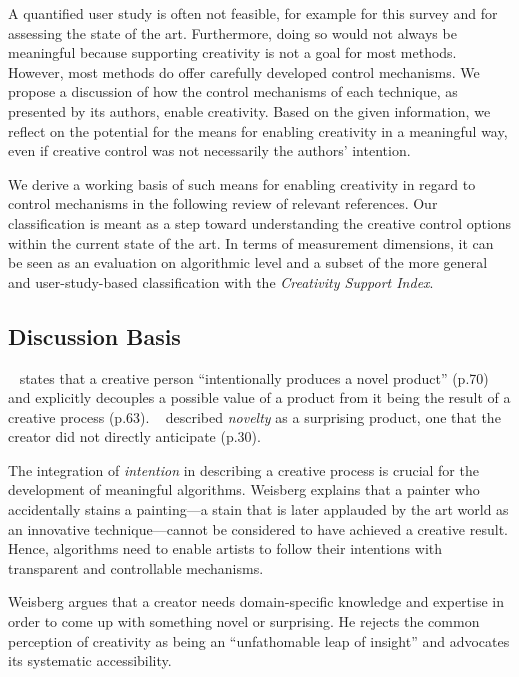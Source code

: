 A quantified user study is often not feasible, for example for this survey and for assessing the state of the art. Furthermore, doing so would not always be meaningful because supporting creativity is not a goal for most methods. However, most methods do offer carefully developed control mechanisms. We propose a discussion of how the control mechanisms of each technique, as presented by its authors, enable creativity. Based on the given information, we reflect on the potential for the means for enabling creativity in a meaningful way, even if creative control was not necessarily the authors' intention. 

We derive a working basis of such means for enabling creativity in regard to control mechanisms in the following review of relevant references. Our classification is meant as a step toward understanding the creative control options within the current state of the art. In terms of measurement dimensions, it can be seen as an evaluation on algorithmic level and a subset of the more general and user-study-based classification with the \textit{Creativity Support Index}. 

\subsection{Discussion Basis}\label{subsec:creative_means}

\citeauthor*{weisberg_2006_cui}~\cite{weisberg_2006_cui} states that a creative person ``intentionally produces a novel product'' (p.70) and explicitly decouples a possible value of a product from it being the result of a creative process (p.63). 
\citeauthor*{boden_2010_cat}~\cite{boden_2010_cat} described \textit{novelty} as a surprising product, one that the creator did not directly anticipate (p.30). 


The integration of \textit{intention} in describing a creative process is crucial for the development of meaningful algorithms. Weisberg explains that a painter who accidentally stains a painting---a stain that is later applauded by the art world as an innovative technique---cannot be considered to have achieved a creative result. Hence, algorithms need to enable artists to follow their intentions with transparent and controllable mechanisms. 

Weisberg argues that a creator needs domain-specific knowledge and expertise in order to come up with something novel or surprising. He rejects the common perception of creativity as being an ``unfathomable leap of insight'' and advocates its systematic accessibility. 


